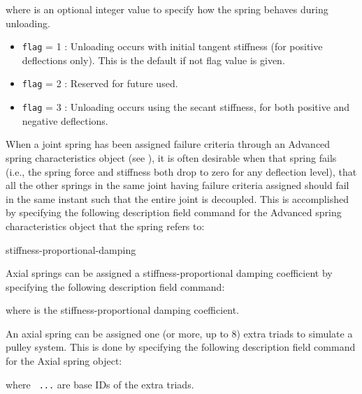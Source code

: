 
\noindent
where {\tt{}} is an optional integer value to specify how
the spring behaves during unloading.

\begin{itemize}
\item{\tt flag} = 1 : Unloading occurs with initial tangent stiffness (for
  positive deflections only). This is the default if not flag value is given.
\item{\tt flag} = 2 : Reserved for future used.
\item{\tt flag} = 3 : Unloading occurs using the secant stiffness,
  for both positive and negative deflections.
\end{itemize}



When a joint spring has been assigned failure criteria through an
Advanced spring characteristics object (see
),
it is often desirable when that spring fails (i.e., the spring force and
stiffness both drop to zero for any deflection level), that all the other
springs in the same joint having failure criteria assigned should fail in the
same instant such that the entire joint is decoupled.
This is accomplished by specifying the following description field command for
the Advanced spring characteristics object that the spring refers to:



           {stiffness-proportional-damping}

Axial springs can be assigned a stiffness-proportional damping
coefficient by specifying the following description field command:


\noindent
where {\tt{}} is the stiffness-proportional damping coefficient.



An axial spring can be assigned one (or more, up to 8) extra triads to simulate
a pulley system. This is done by specifying the following description field
command for the Axial spring object:


\noindent
where {\tt{}  ...} are base IDs of the extra triads.


